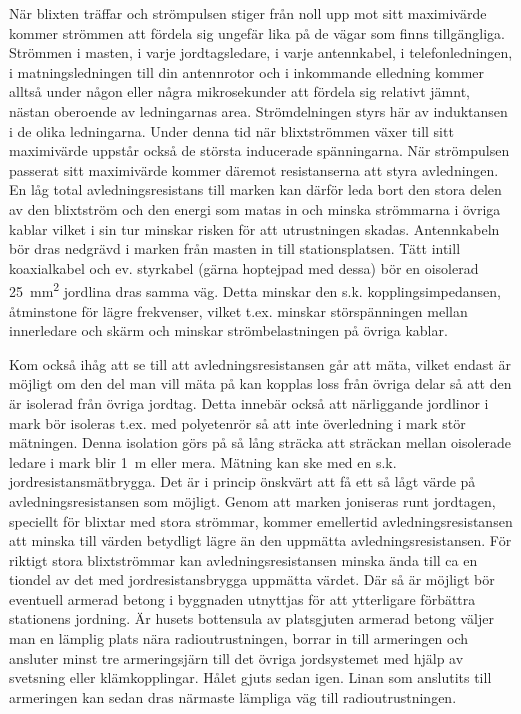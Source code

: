 När blixten träffar och strömpulsen stiger från noll upp mot sitt maximivärde
kommer strömmen att fördela sig ungefär lika på de vägar som finns tillgängliga.
Strömmen i masten, i varje jordtagsledare, i varje antennkabel, i
telefonledningen, i matningsledningen till din antennrotor och i inkommande
elledning kommer alltså under någon eller några mikrosekunder att fördela sig
relativt jämnt, nästan oberoende av ledningarnas area.
Strömdelningen styrs här av induktansen i de olika ledningarna.
Under denna tid när blixtströmmen växer till sitt maximivärde uppstår också de
största inducerade spänningarna.
När strömpulsen passerat sitt maximivärde kommer däremot resistanserna att styra
avledningen.
En låg total avledningsresistans till marken kan därför leda bort den stora
delen av den blixtström och den energi som matas in och minska strömmarna i
övriga kablar vilket i sin tur minskar risken för att utrustningen skadas.
Antennkabeln bör dras nedgrävd i marken från masten in till stationsplatsen.
Tätt intill koaxialkabel och ev. styrkabel (gärna hoptejpad med dessa) bör en
oisolerad \qty{25}{\milli\metre\squared} jordlina dras samma väg.
Detta minskar den s.k. kopplingsimpedansen, åtminstone för lägre frekvenser,
vilket t.ex. minskar störspänningen mellan innerledare och skärm och minskar
strömbelastningen på övriga kablar.

Kom också ihåg att se till att avledningsresistansen går att mäta, vilket endast
är möjligt om den del man vill mäta på kan kopplas loss från övriga delar så att
den är isolerad från övriga jordtag.
Detta innebär också att närliggande jordlinor i mark bör isoleras t.ex. med
polyetenrör så att inte överledning i mark stör mätningen.
Denna isolation görs på så lång sträcka att sträckan mellan oisolerade ledare i
mark blir \qty{1}{\metre} eller mera.
Mätning kan ske med en s.k. jordresistansmätbrygga.
Det är i princip önskvärt att få ett så lågt värde på avledningsresistansen som
möjligt.
Genom att marken joniseras runt jordtagen, speciellt för blixtar med stora
strömmar, kommer emellertid avledningsresistansen att minska till värden
betydligt lägre än den uppmätta avledningsresistansen.
För riktigt stora blixtströmmar kan avledningsresistansen minska ända till ca en
tiondel av det med jordresistansbrygga uppmätta värdet.
Där så är möjligt bör eventuell armerad betong i byggnaden utnyttjas för att
ytterligare förbättra stationens jordning.
Är husets bottensula av platsgjuten armerad betong väljer man en lämplig plats
nära radioutrustningen, borrar in till armeringen och ansluter minst tre
armeringsjärn till det övriga jordsystemet med hjälp av svetsning eller
klämkopplingar.
Hålet gjuts sedan igen.
Linan som anslutits till armeringen kan sedan dras närmaste lämpliga väg till
radioutrustningen.

